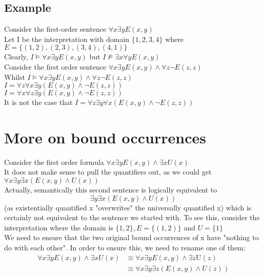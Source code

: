 \documentclass{article}[18pt]
\begin{document}
\subsection{Example}
Consider the first-order sentence $\forall x \exists y E(x,y)$\\
Let I be the interpretation with domain $\{1,2,3,4\}$ where $E = \{ ( 1,2 ) , ( 2,3 ) , ( 3,4 ) , ( 4,1 ) \}$\\
Clearly, $I\models \forall x \exists y E(x,y)$ but $I\not \models \exists x \forall y E(x,y)$\\
Consider the first order sentence $\forall x \exists y E(x,y)\land \forall z\lnot E(z,z)$\\
Whilst $I\models \forall x \exists y E(x,y)\land \forall z \lnot E(z,z)$\\
$I = \forall z \forall x \exists y ( E ( x , y ) \wedge \neg E ( z , z ) )$\\
$I = \forall x \forall z \exists y ( E ( x , y ) \wedge \neg E ( z , z ) )$\\
It is not the case that $I = \forall z \exists y \forall x ( E ( x , y ) \wedge \neg E ( z , z ) )$
\section{More on bound occurrences}
Consider the first order formula $\forall x \exists y E ( x , y ) \wedge \exists x U ( x )$\\
It does not make sense to pull the quantifiers out, as we could get $\forall x \exists y \exists x ( E ( x , y ) \wedge U ( x ) )$\\
Actually, semantically this second sentence is logically equivalent to
$$\exists y \exists x ( E ( x , y ) \wedge U ( x ) )$$
(as existentially quantified x "overwrites" the universally quantified x) which is certainly not equivalent to the sentence we started with. To see this, consider the interpretation where the domain is $\{ 1,2 \} , E = \{ ( 1,2 ) \}$ and $U = \{ 1 \}$\\
We need to ensure that the two original bound occurrences of x have "nothing to do with each other". In order to ensure this, we need to rename one of them:
$$\begin{aligned} \forall x \exists y E ( x , y ) \wedge \exists x U ( x ) & \equiv \forall x \exists y E ( x , y ) \wedge \exists z \mathrm { U } ( z ) \\ & \equiv \forall x \exists y \exists z ( E ( x , y ) \wedge U ( z ) ) \end{aligned}$$
\end{document}
